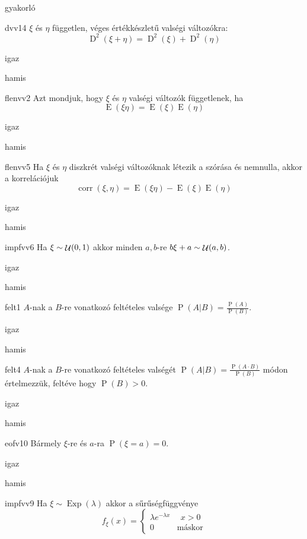 \documentclass[12pt]{article}
\DeclareMathOperator{\Exp}{Exp}
\DeclareMathOperator{\E}{E}
\DeclareMathOperator{\D}{D}
\renewcommand{\P}{\operatorname{P}}
\DeclareMathOperator{\corr}{corr}
\DeclareMathOperator{\Unif}{{\cal U}}
\begin{document}
\begin{quiz}{gyakorló}

\begin{multi}{dvv14}
$\xi$ és $\eta$ független, véges értékkészletű valségi változókra:
$$
\D^2(\xi+\eta)=\D^2(\xi)+\D^2(\eta)
$$
\item* igaz
\item hamis
\end{multi}
\begin{multi}{flenvv2}
Azt mondjuk, hogy $\xi$ és $\eta$ valségi változók függetlenek, ha
$$
\E(\xi \eta)=\E(\xi)\E(\eta)
$$
\item igaz
\item* hamis
\end{multi}
\begin{multi}{flenvv5}
Ha $\xi$ és $\eta$ diszkrét valségi változóknak létezik a szórása és nemnulla, akkor a 
korrelációjuk
$$
\corr(\xi,\eta)=\E(\xi\eta)-\E(\xi)\E(\eta)
$$
\item igaz
\item* hamis
\end{multi}
\begin{multi}{impfvv6}
Ha $\xi\sim \Unif(0,1)$ akkor  minden $a,b$-re $b\xi+a\sim \Unif(a,b)$.
\item igaz
\item* hamis
\end{multi}
\begin{multi}{felt1}
$A$-nak a $B$-re vonatkozó feltételes valsége $\P(A|B)=\frac{\P(A)}{\P(B)}$.
\item igaz
\item* hamis
\end{multi}
\begin{multi}{felt4}
$A$-nak a $B$-re vonatkozó feltételes valségét $\P(A|B)=\frac{\P(A\cdot B)}{\P(B)}$ módon értelmezzük, feltéve hogy $\P(B)>0$.
\item* igaz
\item hamis
\end{multi}
\begin{multi}{eofv10}
Bármely $\xi$-re és $a$-ra $\P(\xi= a)=0$.
\item igaz
\item* hamis
\end{multi}
\begin{multi}{impfvv9}
Ha $\xi\sim \Exp(\lambda)$ akkor a sűrűségfüggvénye 
$$
f_{\xi}(x)=
\begin{cases}
\lambda e^{-\lambda x}& \ \ x>0\\
0 & \text{máskor} 
\end{cases}
$$
\end{multi}
\end{quiz}
\end{document}
